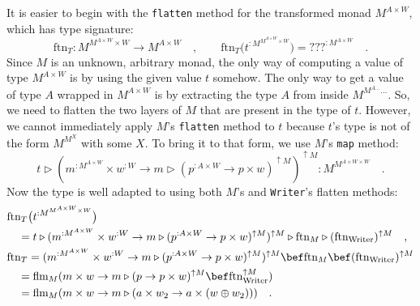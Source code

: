 It is easier to begin with the \lstinline!flatten! method for the
transformed monad $M^{A\times W}$, which has type signature:
\[
\text{ftn}_{T}:M^{M^{A\times W}\times W}\rightarrow M^{A\times W}\quad,\quad\quad\text{ftn}_{T}\big(t^{:M^{M^{A\times W}\times W}}\big)=\text{???}^{:M^{A\times W}}\quad.
\]
Since $M$ is an unknown, arbitrary monad, the only way of computing
a value of type $M^{A\times W}$ is by using the given value $t$
somehow. The only way to get a value of type $A$ wrapped in $M^{A\times W}$
is by extracting the type $A$ from inside $M^{M^{A...}...}$. So,
we need to flatten the two layers of $M$ that are present in the
type of $t$. However, we cannot immediately apply $M$\textsf{'}s \lstinline!flatten!
method to $t$ because $t$\textsf{'}s type is not of the form $M^{M^{X}}$
with some $X$. To bring it to that form, we use $M$\textsf{'}s \lstinline!map!
method:
\[
t\triangleright(m^{:M^{A\times W}}\times w^{:W}\rightarrow m\triangleright(p^{:A\times W}\rightarrow p\times w)^{\uparrow M})^{\uparrow M}:M^{M^{A\times W\times W}}\quad.
\]
Now the type is well adapted to using both $M$\textsf{'}s and \lstinline!Writer!\textsf{'}s
flatten methods:
\begin{align*}
 & \text{ftn}_{T}\big(t^{:M^{M^{A\times W}\times W}}\big)\\
 & \quad=t\triangleright(m^{:M^{A\times W}}\times w^{:W}\rightarrow m\triangleright(p^{:A\times W}\rightarrow p\times w)^{\uparrow M})^{\uparrow M}\triangleright\text{ftn}_{M}\triangleright(\text{ftn}_{\text{Writer}})^{\uparrow M}\quad,\\
 & \text{ftn}_{T}=(m^{:M^{A\times W}}\times w^{:W}\rightarrow m\triangleright(p^{:A\times W}\rightarrow p\times w)^{\uparrow M})^{\uparrow M}\bef\text{ftn}_{M}\bef(\text{ftn}_{\text{Writer}})^{\uparrow M}\\
 & \quad=\text{flm}_{M}(m\times w\rightarrow m\triangleright(p\rightarrow p\times w)^{\uparrow M}\bef\text{ftn}_{\text{Writer}}^{\uparrow M})\\
 & \quad=\text{flm}_{M}(m\times w\rightarrow m\triangleright(a\times w_{2}\rightarrow a\times(w\oplus w_{2})))\quad.
\end{align*}

